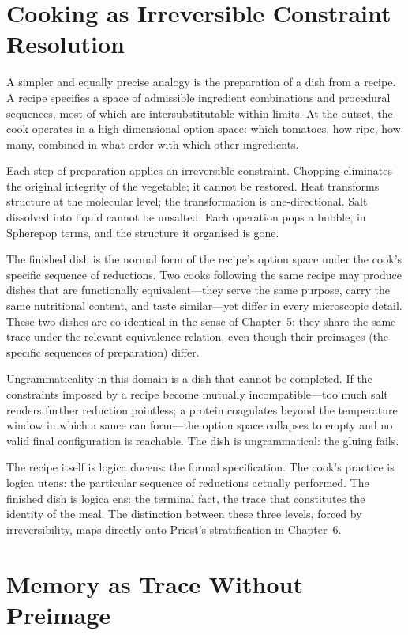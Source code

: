 \documentclass[12pt, oneside]{amsbook}
\theoremstyle{plain}
\theoremstyle{definition}
\theoremstyle{remark}
\begin{document}
\section{Cooking as Irreversible Constraint Resolution}

A simpler and equally precise analogy is the preparation of a dish from a
recipe. A recipe specifies a space of admissible ingredient combinations and
procedural sequences, most of which are intersubstitutable within limits. At
the outset, the cook operates in a high-dimensional option space: which tomatoes,
how ripe, how many, combined in what order with which other ingredients.

Each step of preparation applies an irreversible constraint. Chopping eliminates
the original integrity of the vegetable; it cannot be restored. Heat transforms
structure at the molecular level; the transformation is one-directional. Salt
dissolved into liquid cannot be unsalted. Each operation pops a bubble, in
Spherepop terms, and the structure it organised is gone.

The finished dish is the normal form of the recipe's option space under the
cook's specific sequence of reductions. Two cooks following the same recipe may
produce dishes that are functionally equivalent---they serve the same purpose,
carry the same nutritional content, and taste similar---yet differ in every
microscopic detail. These two dishes are co-identical in the sense of
Chapter~5: they share the same trace under the relevant equivalence relation,
even though their preimages (the specific sequences of preparation) differ.

Ungrammaticality in this domain is a dish that cannot be completed. If the
constraints imposed by a recipe become mutually incompatible---too much salt
renders further reduction pointless; a protein coagulates beyond the
temperature window in which a sauce can form---the option space collapses
to empty and no valid final configuration is reachable. The dish is
ungrammatical: the gluing fails.

The recipe itself is logica docens: the formal specification. The cook's
practice is logica utens: the particular sequence of reductions actually
performed. The finished dish is logica ens: the terminal fact, the trace that
constitutes the identity of the meal. The distinction between these three
levels, forced by irreversibility, maps directly onto Priest's stratification
in Chapter~6.

\section{Memory as Trace Without Preimage}
\end{document}
